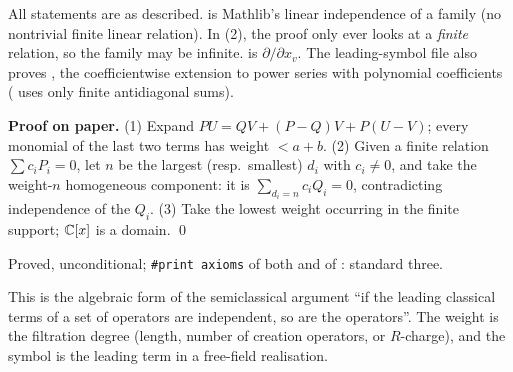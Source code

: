 \begin{dictionary}
All statements are as described.  is Mathlib's linear independence of a family
(no nontrivial finite linear relation). In (2), the proof only ever looks at a \emph{finite} relation, so the
family may be infinite.  is $\partial/\partial x_v$. The leading-symbol file also proves
, the coefficientwise extension to power series with polynomial coefficients (
uses only finite antidiagonal sums).
\end{dictionary}

\textbf{Proof on paper.} (1) Expand $PU = QV + (P-Q)V + P(U-V)$; every monomial of the last two terms has weight
$<a+b$. (2) Given a finite relation $\sum c_iP_i = 0$, let $n$ be the largest (resp.\ smallest) $d_i$ with
$c_i\ne0$, and take the weight-$n$ homogeneous component: it is $\sum_{d_i=n}c_iQ_i = 0$, contradicting
independence of the $Q_i$. (3) Take the lowest weight occurring in the finite support; ${\mathbb{C}}[x]$ is a domain. \qed

\begin{status}
Proved, unconditional; \texttt{\#print axioms} of both \allowbreak{}\allowbreak{} and of
: standard three.
\end{status}

\begin{physics}
This is the algebraic form of the semiclassical argument ``if the leading classical terms of a set of operators are
independent, so are the operators''. The weight is the filtration degree (length, number of creation operators,
or $R$-charge), and the symbol is the leading term in a free-field realisation.
\end{physics}


